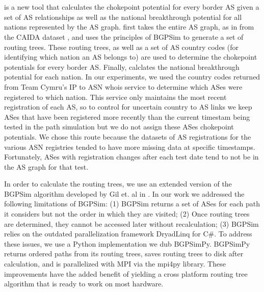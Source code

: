 
\section{\toolname}

\toolname{} is a new tool that calculates the chokepoint potential for every border AS given a set of AS relationships as well as the national breakthrough potential
for all nations represented by the AS graph.
\toolname{} first takes the entire AS graph, as in from the CAIDA dataset \cite{CAIDA}, and uses the principles of BGPSim \cite{quicksand}
to generate a set of routing trees. These routing trees, as well as a set of AS country codes (for identifying which nation an AS belongs to)
are used to determine the chokepoint potentials for every border AS. Finally, \toolname{} calclates the national breakthrough potential 
for each nation. In our experiments, we used the country codes returned from Team Cymru's
IP to ASN whois service \cite{cymru} to determine which ASes were registered to which nation. 
This service only maintains the most recent registration of each AS, so to control for uncertain country to AS links
we keep ASes that have been registered more recently than the current timestam being tested in the path simulation but we do not assign these ASes chokepoint potentials. We 
chose this route because the datasets of AS registrations for the various ASN registries tended to have more missing data at specific timestamps.
Fortunately, ASes with registration changes after each test date tend to not be in the AS graph for that test.

\par
In order to calculate the routing trees, we use an extended version of the BGPSim algorithm developed by Gil et. al in \cite{quicksand}. In
our work we addressed the following limitations of BGPSim: (1) BGPSim returns a set of ASes for each path it considers but not the order in which
they are visited; (2) Once routing trees are determined, they cannot be accessed later without recalculation; (3) BGPSim relies on the outdated parallelization
framework DryadLinq for C\#. To address these issues, we use a Python implementation we dub BGPSimPy. BGPSimPy returns ordered paths from its routing trees,
saves routing trees to disk after calculation, and is parallelized with MPI via the mpi4py library. These improvements have the added benefit of yielding a cross platform
routing tree algorithm that is ready to work on most hardware.

